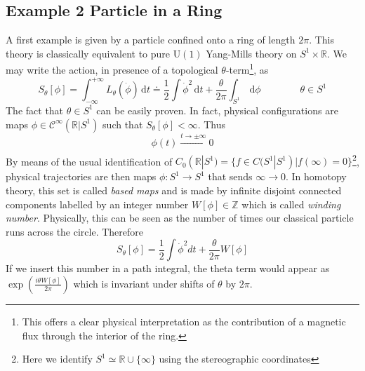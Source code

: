 \documentclass[11pt]{article}
\theoremstyle{definition}
\numberwithin{equation}{section}
\newcommand*\cC{\mathcal{C}}
\newcommand*\bbR{\mathbb{R}}
\newcommand*\U{\mathrm{U}}
\begin{document}
\subsection{Example 2 Particle in a Ring}
A first example is given by a particle confined onto a ring of length $2\pi$. This theory is classically equivalent to pure $\U(1)$ Yang-Mills theory on $S^{1}\times\bbR$. We may write the action, in presence of a topological $\theta$-term\footnote{This offers a clear physical interpretation as the contribution of a magnetic flux through the interior of the ring.}, as
\begin{equation}
    S_\theta[\phi]= \int_{-\infty}^{+\infty} L_{\theta}(\Dot{\phi})\, \mathrm dt \doteq \frac{1}{2}\int \dot \phi^2\, \mathrm dt + \frac{\theta}{2\pi}\int_{S^1}\, \mathrm d\phi\qquad\qquad \theta\in S^1
\end{equation}
The fact that $\theta\in S^{1}$ can be easily proven. In fact, physical configurations are maps $\phi \in \cC^{\infty}(\mathbb{R}| S^1)$ such that $S_{\theta}[\phi]< \infty$. Thus
\begin{equation}
    \phi(t) \xrightarrow[]{t \to \pm \infty} 0
\end{equation}
By means of the usual identification of ${C}_0(\mathbb{R}|S^1) =\{f \in {C}(S^1| S^1) | f(\infty)=0\}$\footnote{Here we identify $S^1 \simeq \mathbb{R} \cup \{\infty\}$ using the stereographic coordinates}, physical trajectories are then maps $\phi: S^1 \to S^1$ that sends $\infty \to 0$. In homotopy theory, this set is called \textit{based maps} and is made by infinite disjoint connected components labelled by an integer number $ W[\phi] \in \mathbb{Z}$ which is called \textit{winding number}. Physically, this can be seen as the number of times our classical particle runs across the circle. Therefore
\begin{equation}
    S_{\theta}[\phi] = \frac{1}{2} \int \Dot{\phi}^2 dt + \frac{\theta}{2 \pi} W[\phi]
\end{equation}
If we insert this number in a path integral, the theta term would appear as $\exp(\frac{i \theta W[\phi]}{2\pi})$ which is invariant under shifts of $\theta$ by $2 \pi$.
\end{document}
